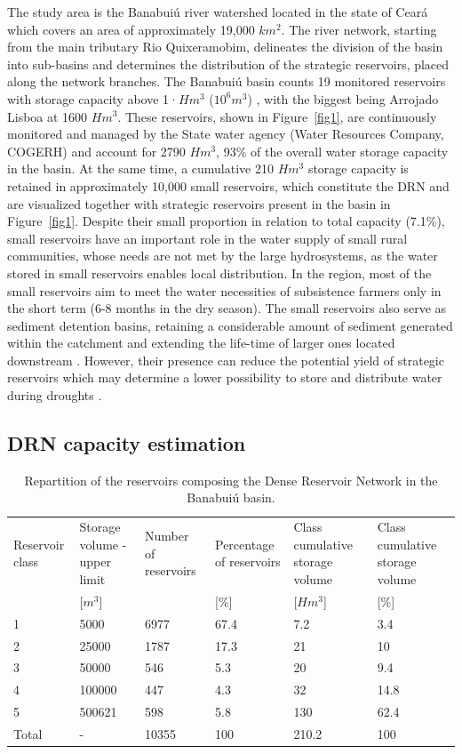 \documentclass[draft]{agujournal2019}
\begin{document}
The study area is the Banabuiú river watershed located in the state of Ceará which covers an area of approximately 19,000 $km^2$. The river network, starting from the main tributary Rio Quixeramobim, delineates the division of the basin into sub-basins and determines the distribution of the strategic reservoirs, placed along the network branches. The Banabuiú basin counts 19 monitored reservoirs with storage capacity above 1·$Hm^3$ ($10^6 m^3$) , with the biggest being Arrojado Lisboa at 1600 $Hm^3$. These reservoirs, shown in Figure~\ref{fig1}, are continuously monitored and managed by the State water agency (Water Resources Company, COGERH) and account for 2790 $Hm^3$, 93\% of the overall water storage capacity in the basin. At the same time, a cumulative 210 $Hm^3$ storage capacity is retained in approximately 10,000 small reservoirs, which constitute the DRN and are visualized together with strategic reservoirs present in the basin in Figure~\ref{fig1}. Despite their small proportion in relation to total capacity (7.1\%), small reservoirs have an important role in the water supply of small rural communities, whose needs are not met by the large hydrosystems, as the water stored in small reservoirs enables local distribution. In the region, most of the small reservoirs aim to meet the water necessities of subsistence farmers only in the short term (6-8 months in the dry season). The small reservoirs also serve as sediment detention basins, retaining a considerable amount of sediment generated within the catchment and extending the life-time of larger ones located downstream \cite{Mamede2018}. However, their presence can reduce the potential yield of strategic reservoirs which may determine a lower possibility to store and distribute water during droughts \cite{Krol2011}. 

\subsection{DRN capacity estimation}\label{sec:drncap}

\begin{table}
 \caption{Repartition of the reservoirs composing the Dense Reservoir Network in the Banabuiú basin.}\label{tab1}
 \centering
 \begin{tabular*}{\textwidth}{m{1.5cm} m{2cm} m{2cm} m{2cm} m{2.3cm} m{2.3cm}}
 \hline
  Reservoir class & Storage volume - upper limit &  Number of reservoirs & Percentage of reservoirs & Class cumulative storage volume & Class cumulative storage volume\\
  & [$m^3$] & & [\%] & [$Hm^3$] & [\%]\\
 \hline
1	& 5000	 & 6977	&	67.4	 &	7.2  &	3.4\\
2	& 25000	 & 1787	&	17.3	 &	21	 & 10\\
3	& 50000	 & 546	&	5.3	 &	20	 & 9.4\\
4	& 100000	 & 447	&	4.3	 &	32	 & 14.8\\
5	& 500621	 & 598	&	5.8	 &	130	 & 62.4\\
 \hline
Total &	-	& 10355 &	100	 &  210.2 &	100\\
 \end{tabular*}
\end{table}
\end{document}
